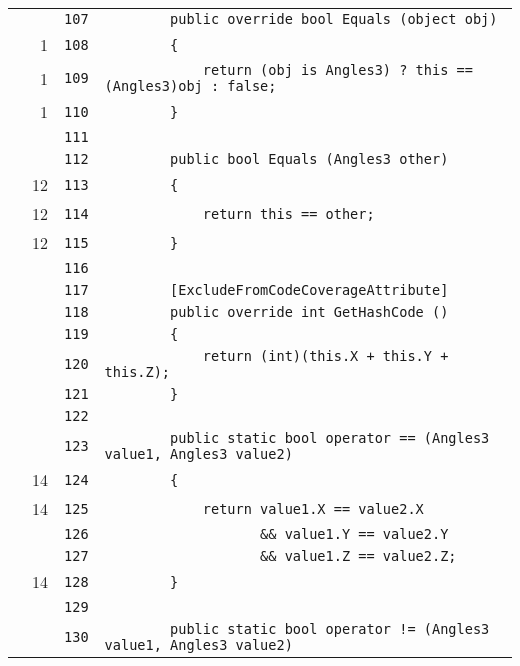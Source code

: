 \documentclass[a4paper,10pt]{article}
\begin{document}
\begin{longtable}[l]{lrrl}
\cellcolor{gray} &  & \verb~107~ & \verb~        public override bool Equals (object obj)~\\
\cellcolor{green} & 1 & \verb~108~ & \verb~        {~\\
\cellcolor{green} & 1 & \verb~109~ & \verb~            return (obj is Angles3) ? this == (Angles3)obj : false;~\\
\cellcolor{green} & 1 & \verb~110~ & \verb~        }~\\
\cellcolor{gray} &  & \verb~111~ & \verb~~\\
\cellcolor{gray} &  & \verb~112~ & \verb~        public bool Equals (Angles3 other)~\\
\cellcolor{green} & 12 & \verb~113~ & \verb~        {~\\
\cellcolor{green} & 12 & \verb~114~ & \verb~            return this == other;~\\
\cellcolor{green} & 12 & \verb~115~ & \verb~        }~\\
\cellcolor{gray} &  & \verb~116~ & \verb~~\\
\cellcolor{gray} &  & \verb~117~ & \verb~        [ExcludeFromCodeCoverageAttribute]~\\
\cellcolor{gray} &  & \verb~118~ & \verb~        public override int GetHashCode ()~\\
\cellcolor{gray} &  & \verb~119~ & \verb~        {~\\
\cellcolor{gray} &  & \verb~120~ & \verb~            return (int)(this.X + this.Y + this.Z);~\\
\cellcolor{gray} &  & \verb~121~ & \verb~        }~\\
\cellcolor{gray} &  & \verb~122~ & \verb~~\\
\cellcolor{gray} &  & \verb~123~ & \verb~        public static bool operator == (Angles3 value1, Angles3 value2)~\\
\cellcolor{green} & 14 & \verb~124~ & \verb~        {~\\
\cellcolor{green} & 14 & \verb~125~ & \verb~            return value1.X == value2.X~\\
\cellcolor{gray} &  & \verb~126~ & \verb~                   && value1.Y == value2.Y~\\
\cellcolor{gray} &  & \verb~127~ & \verb~                   && value1.Z == value2.Z;~\\
\cellcolor{green} & 14 & \verb~128~ & \verb~        }~\\
\cellcolor{gray} &  & \verb~129~ & \verb~~\\
\cellcolor{gray} &  & \verb~130~ & \verb~        public static bool operator != (Angles3 value1, Angles3 value2)~\\

\end{longtable}
\end{document}
